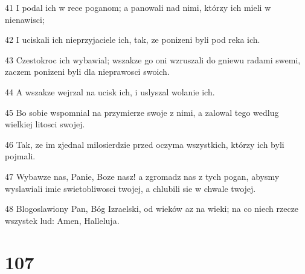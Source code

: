 \par 41 I podal ich w rece poganom; a panowali nad nimi, którzy ich mieli w nienawisci;
\par 42 I uciskali ich nieprzyjaciele ich, tak, ze ponizeni byli pod reka ich.
\par 43 Czestokroc ich wybawial; wszakze go oni wzruszali do gniewu radami swemi, zaczem ponizeni byli dla nieprawosci swoich.
\par 44 A wszakze wejrzal na ucisk ich, i uslyszal wolanie ich.
\par 45 Bo sobie wspomnial na przymierze swoje z nimi, a zalowal tego wedlug wielkiej litosci swojej.
\par 46 Tak, ze im zjednal milosierdzie przed oczyma wszystkich, którzy ich byli pojmali.
\par 47 Wybawze nas, Panie, Boze nasz! a zgromadz nas z tych pogan, abysmy wyslawiali imie swietobliwosci twojej, a chlubili sie w chwale twojej.
\par 48 Blogoslawiony Pan, Bóg Izraelski, od wieków az na wieki; na co niech rzecze wszystek lud: Amen, Halleluja.

\chapter{107}

